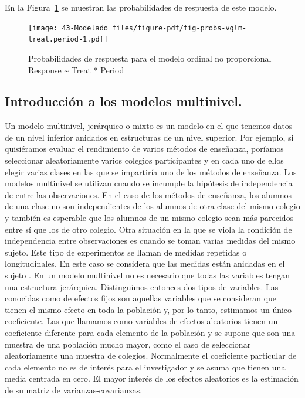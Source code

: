 \documentclass[
  12pt,
  a4paper,
  extrafontsizes,
  onecolumn,
  openright]{memoir}
\begin{document}
\normalsize

En la Figura~\ref{fig-probs-vglm-treat.period} se muestran las
probabilidades de respuesta de este modelo.

\begin{figure}[h]

{\centering \texttt{[image: 43-Modelado\_files/figure-pdf/fig-probs-vglm-treat.period-1.pdf]}

}

\caption{\label{fig-probs-vglm-treat.period}Probabilidades de respuesta
para el modelo ordinal no proporcional Response \textasciitilde{} Treat
* Period}

\end{figure}

\hypertarget{introducciuxf3n-a-los-modelos-multinivel.}{%
\subsection{Introducción a los modelos
multinivel.}\label{introducciuxf3n-a-los-modelos-multinivel.}}

Un modelo multinivel, jerárquico o mixto es un modelo en el que tenemos
datos de un nivel inferior anidados en estructuras de un nivel superior.
Por ejemplo, si quisiéramos evaluar el rendimiento de varios métodos de
enseñanza, poríamos seleccionar aleatoriamente varios colegios
participantes y en cada uno de ellos elegir varias clases en las que se
impartiría uno de los métodos de enseñanza. Los modelos multinivel se
utilizan cuando se incumple la hipótesis de independencia de entre las
observaciones. En el caso de los métodos de enseñanza, los alumnos de
una clase no son independientes de los alumnos de otra clase del mismo
colegio y también es esperable que los alumnos de un mismo colegio sean
más parecidos entre sí que los de otro colegio. Otra situación en la que
se viola la condición de independencia entre observaciones es cuando se
toman varias medidas del mismo sujeto. Este tipo de experimentos se
llaman de medidas repetidas o longitudinales. En este caso se considera
que las medidas están anidadas en el sujeto \autocite[ver][]{Liu2202}.
En un modelo multinivel no es necesario que todas las variables tengan
una estructura jerárquica. Distinguimos entonces dos tipos de variables.
Las conocidas como de efectos fijos son aquellas variables que se
consideran que tienen el mismo efecto en toda la población y, por lo
tanto, estimamos un único coeficiente. Las que llamamos como variables
de efectos aleatorios tienen un coeficiente diferente para cada elemento
de la población y se supone que son una muestra de una población mucho
mayor, como el caso de seleccionar aleatoriamente una muestra de
colegios. Normalmente el coeficiente particular de cada elemento no es
de interés para el investigador y se asuma que tienen una media centrada
en cero. El mayor interés de los efectos aleatorios es la estimación de
su matriz de varianzas-covarianzas.
\end{document}
